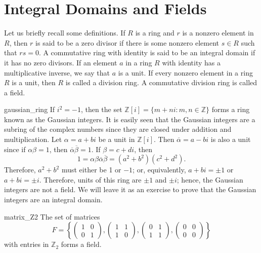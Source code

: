  
 
\section{Integral Domains and Fields}
 
 
Let us briefly recall some definitions. If $R$ is a ring and $r$ is a
nonzero element in $R$, then $r$ is said to  be a {\bfi zero divisor\/}
if there is some nonzero element $s \in R$ such that $rs = 0$. A
commutative ring with identity is said to be an {\bfi integral
domain\/} if it has no zero divisors.  If an element $a$ in a ring $R$
with identity has a multiplicative inverse, we say that $a$ is a {\bfi
unit}. If every nonzero element in a ring $R$ is a unit, then $R$ is
called a {\bfi division ring}.  A commutative division ring is called
a {\bfi field}. 
 
 
\begin{example}{gaussian_ring}
If $i^2 = -1$, then the set ${\mathbb Z}[ i ] = \{ m + ni : m, n \in
{\mathbb Z} \}$ forms a ring known as the {\bfi Gaussian
integers}\label{gaussianintegers}. It is
easily seen that the Gaussian integers are a subring of the complex
numbers since they are closed under addition and multiplication. Let
$\alpha = a + bi$ be a unit in ${\mathbb Z}[ i ]$. Then
$\overline{\alpha} = a - bi$ is also a unit since if $\alpha \beta =
1$, then $\overline{\alpha} \overline{\beta} = 1$. If $\beta = c +
di$, then   
\[
1 = \alpha \beta \overline{\alpha} \overline{\beta} = (a^2 +
b^2 )(c^2
+ d^2).
\]
Therefore, $a^2 + b^2$ must either be 1 or $-1$; or, equivalently, $a
+ bi = \pm 1$ or $a+ bi = \pm i$.  Therefore, units of this ring are
$\pm 1$ and $\pm i$; hence, the Gaussian integers are not a field. We
will leave it as an exercise to prove that the Gaussian integers are
an integral domain. 
\end{example}
 
 
\begin{example}{matrix_Z2}
The set of matrices
\[
F
=
\left\{
\begin{pmatrix}
1 & 0 \\
0 & 1
\end{pmatrix},
\begin{pmatrix}
1 & 1 \\
1 & 0
\end{pmatrix},
\begin{pmatrix}
0 & 1 \\
1 & 1
\end{pmatrix},
\begin{pmatrix}
0 & 0 \\
0 & 0
\end{pmatrix}
\right\}
\]
with entries in ${\mathbb Z}_2$ forms a field.
\end{example}
 
